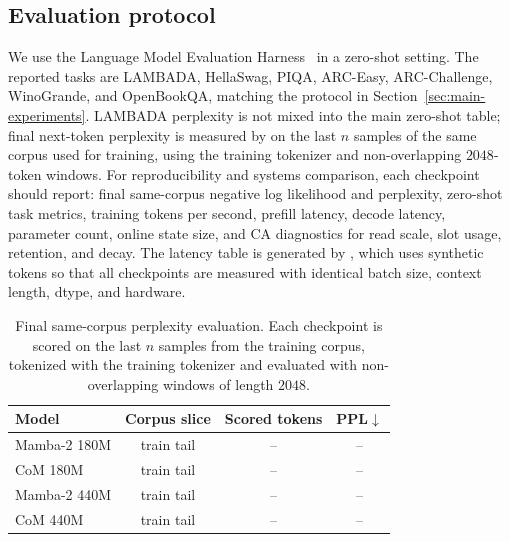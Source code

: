 \subsection{Evaluation protocol}

We use the Language Model Evaluation Harness~\citep{gao2024framework} in a zero-shot setting. The reported tasks are LAMBADA, HellaSwag, PIQA, ARC-Easy, ARC-Challenge, WinoGrande, and OpenBookQA, matching the protocol in Section~\ref{sec:main-experiments}. LAMBADA perplexity is not mixed into the main zero-shot table; final next-token perplexity is measured by  on the last $n$ samples of the same corpus used for training, using the training tokenizer and non-overlapping $2048$-token windows. For reproducibility and systems comparison, each checkpoint should report: final same-corpus negative log likelihood and perplexity, zero-shot task metrics, training tokens per second, prefill latency, decode latency, parameter count, online state size, and CA diagnostics for read scale, slot usage, retention, and decay. The latency table is generated by , which uses synthetic tokens so that all checkpoints are measured with identical batch size, context length, dtype, and hardware.

\begin{table}[ht]
\centering
\caption{Final same-corpus perplexity evaluation. Each checkpoint is scored on the last $n$ samples from the training corpus, tokenized with the training tokenizer and evaluated with non-overlapping windows of length $2048$.}
\label{tab:lm-final-ppl}
\small
\begin{tabular}{@{}lccc@{}}
\toprule
\textbf{Model} & \textbf{Corpus slice} & \textbf{Scored tokens} & \textbf{PPL}$\downarrow$ \\
\midrule
Mamba-2 180M & train tail & -- & -- \\
CoM 180M & train tail & -- & -- \\
Mamba-2 440M & train tail & -- & -- \\
CoM 440M & train tail & -- & -- \\
\bottomrule
\end{tabular}
\end{table}
